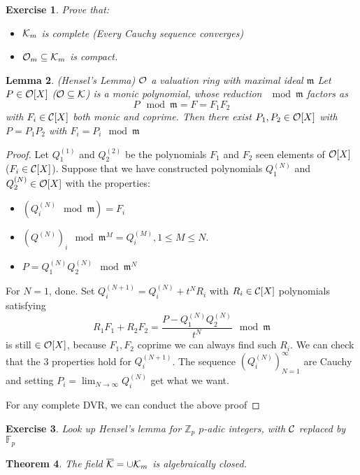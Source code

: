 \documentclass[11pt]{article}
\newtheorem{thm}{Theorem}[section]
\newtheorem{lemma}[thm]{Lemma}
\newtheorem{exercise}[thm]{Exercise}
\newcommand{\intg}{\mathbb Z}
\newcommand{\bbf}{\mathbb F}
\newcommand{\scm}{{\mathfrak m}}
\newcommand{\calc}{{\cal C}}
\newcommand{\calk}{{\cal K}}
\newcommand{\calo}{{\cal O}}
\newcommand{\lrta}{\longrightarrow}
\begin{document}
\begin{exercise}Prove that:
\begin{itemize}
\item $\calk_m$ is complete (Every Cauchy sequence converges)
\item $\calo_m\subseteq \calk_m$ is compact.
\end{itemize}
\end{exercise}

\begin{lemma}\label{lem:Hensel's_lemma}
(Hensel's Lemma) $\calo$ a valuation ring with maximal ideal $\scm$ Let $P\in\calo[X]$ ($\calo\subseteq\calk$) is  a monic polynomial, whose reduction $\mod\scm$ factors as 
$$
P\mod \scm=F=F_1 F_2
$$ 
with $F_i\in \calc[X]$ both monic and coprime. Then there exist $P_1,P_2\in\calo[X]$ with $P=P_1P_2$ with $F_i=P_i\mod \scm$
\end{lemma}
\begin{proof}
Let $Q^{(1)}_1$ and $Q^{(2)}_2$ be the polynomials $F_1$ and $F_2$ seen elements of $\calo[X]$ ($F_i\in \calc[X]$). Suppose that we have constructed polynomials $Q_1^{(N)}$ and $Q^{(N)}_2\in\calo[X]$ with the properties:
\begin{itemize}
\item $(Q^{(N)}_i \mod \scm)=F_i$
\item $(Q^{(N)})_i\mod \scm^M=Q^{(M)}_i,1\leq M\leq N.$
\item $P=Q^{(N)}_1 Q^{(N)}_2\mod \scm^N$
\end{itemize}
For $N=1$, done. Set $Q^{(N+1)}_i=Q^{(N)}_i+t^N R_i$ with $R_i\in \calc[X]$ polynomials satisfying 
$$
R_1F_1+R_2F_2=\frac{P-Q^{(N)}_1Q^{(N)}_2}{t^N}\mod \scm
$$
is still $\in\calo[X]$, because $F_1,F_2$ coprime we can always find such $R_i$. We can check that the 3 properties hold for $Q^{(N+1)}_i$. The sequence $(Q_i^{(N)})^\infty_{N=1}$ are Cauchy and setting $P_i=\lim_{N\lrta \infty}Q^{(N)}_i$ get what we want.

For any complete DVR, we can conduct the above proof
\end{proof}

\begin{exercise}
Look up Hensel's lemma for $\intg_p$ $p$-adic integers, with $\calc$ replaced by $\bbf_p$
\end{exercise}

\begin{thm}\label{thm:K_algebraically_closed}
The field $\overline{\calk}=\cup\calk_m$ is algebraically closed.
\end{thm}
\end{document}
